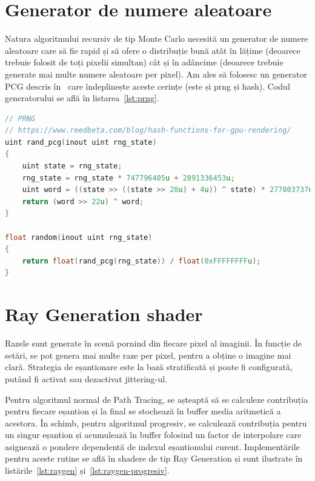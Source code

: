 \documentclass[12pt,a4paper]{report}
\numberwithin{equation}{section} %
\begin{document}
\section{Generator de numere aleatoare}

Natura algoritmului recursiv de tip Monte Carlo necesită un generator de numere
aleatoare care să fie rapid și să ofere o distribuție bună atât în lățime (deoarece
trebuie folosit de toți pixelii simultan) cât și în adâncime (deoarece trebuie
generate mai multe numere aleatoare per pixel). Am ales să folosesc un generator
PCG descris în~\cite{prng} care îndeplinește aceste cerințe (este și prng și hash). Codul
generatorului se află în listarea~\ref{lst:prng}.
\begin{lstlisting}[caption={Generatorul de numere aleatoare PCG\protect\footnotemark},label={lst:prng},language=C++]
// PRNG
// https://www.reedbeta.com/blog/hash-functions-for-gpu-rendering/
uint rand_pcg(inout uint rng_state)
{
	uint state = rng_state;
	rng_state = rng_state * 747796405u + 2891336453u;
	uint word = ((state >> ((state >> 28u) + 4u)) ^ state) * 277803737u;
	return (word >> 22u) ^ word;
}

float random(inout uint rng_state)
{
	return float(rand_pcg(rng_state)) / float(0xFFFFFFFFu);
}
\end{lstlisting}

\section{Ray Generation shader}

Razele sunt generate în scenă pornind din fiecare pixel al imaginii. În funcție
de setări, se pot genera mai multe raze per pixel, pentru a obține o imagine
mai clară. Strategia de eșantionare este la bază stratificată și poate fi configurată,
putând fi activat sau dezactivat jittering-ul.

Pentru algoritmul normal de Path Tracing, se așteaptă să se calculeze
contribuția pentru fiecare eșantion și la final se stochează în buffer
media aritmetică a acestora. În schimb, pentru algoritmul progresiv, se
calculează contribuția pentru un singur eșantion și acumulează în buffer
folosind un factor de interpolare care asignează o pondere dependentă de
indexul eșantionului curent. Implementările pentru aceste rutine se află în
shadere de tip Ray Generation și sunt ilustrate în listările~\ref{lst:raygen} și~\ref{lst:raygen-progresiv}.
\end{document}
